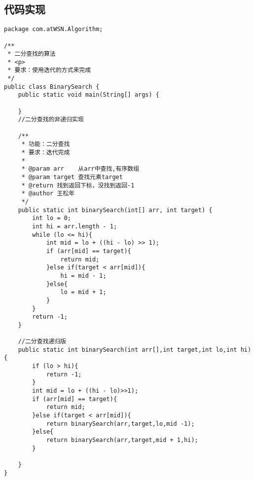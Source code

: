 \documentclass[a4paper]{report}
\begin{document}
\subsection{代码实现}
\begin{lstlisting}
package com.atWSN.Algorithm;

/**
 * 二分查找的算法
 * <p>
 * 要求：使用迭代的方式来完成
 */
public class BinarySearch {
    public static void main(String[] args) {

    }
    //二分查找的非递归实现

    /**
     * 功能：二分查找
     * 要求：迭代完成
     *
     * @param arr    从arr中查找,有序数组
     * @param target 查找元素target
     * @return 找到返回下标，没找到返回-1
     * @author 王松年
     */
    public static int binarySearch(int[] arr, int target) {
        int lo = 0;
        int hi = arr.length - 1;
        while (lo <= hi){
            int mid = lo + ((hi - lo) >> 1);
            if (arr[mid] == target){
                return mid;
            }else if(target < arr[mid]){
                hi = mid - 1;
            }else{
                lo = mid + 1;
            }
        }
        return -1;
    }
    
    //二分查找递归版
    public static int binarySearch(int arr[],int target,int lo,int hi){
        if (lo > hi){
            return -1;
        }
        int mid = lo + ((hi - lo)>>1);
        if (arr[mid] == target){
            return mid;
        }else if(target < arr[mid]){
            return binarySearch(arr,target,lo,mid -1);
        }else{
            return binarySearch(arr,target,mid + 1,hi);
        }

    }
}
\end{lstlisting}
\end{document}
